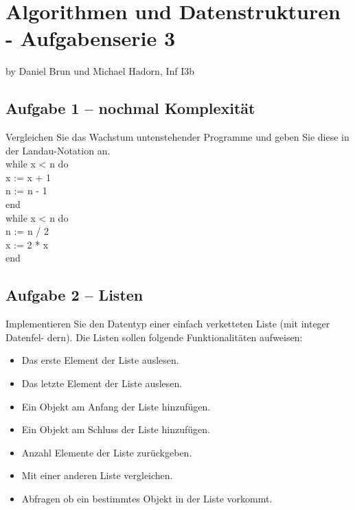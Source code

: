 
\chapter*{Algorithmen und Datenstrukturen - Aufgabenserie 3}
\begin{flushright}
by Daniel Brun und Michael Hadorn, Inf I3b
\end{flushright}
\section*{Aufgabe 1 – nochmal Komplexität}

Vergleichen Sie das Wachstum untenstehender Programme und geben Sie diese in der Landau-Notation an.\\


while x < n do\\
	x := x + 1\\
	n := n - 1\\	
end\\


while x < n do\\
	n := n / 2\\
	x := 2 * x\\
end\\

\newpage

\section*{Aufgabe 2 – Listen}
Implementieren Sie den Datentyp einer einfach verketteten Liste (mit integer Datenfel- dern). Die Listen sollen folgende Funktionalitäten aufweisen:\\

\begin{itemize}
	\item
		Das erste Element der Liste auslesen.
	\item
		Das letzte Element der Liste auslesen.
	\item
		Ein Objekt am Anfang der Liste hinzufügen.
	\item
		Ein Objekt am Schluss der Liste hinzufügen.
	\item
		Anzahl Elemente der Liste zurückgeben.
	\item
		Mit einer anderen Liste vergleichen.
	\item
		Abfragen ob ein bestimmtes Objekt in der Liste vorkommt.
\end{itemize}

